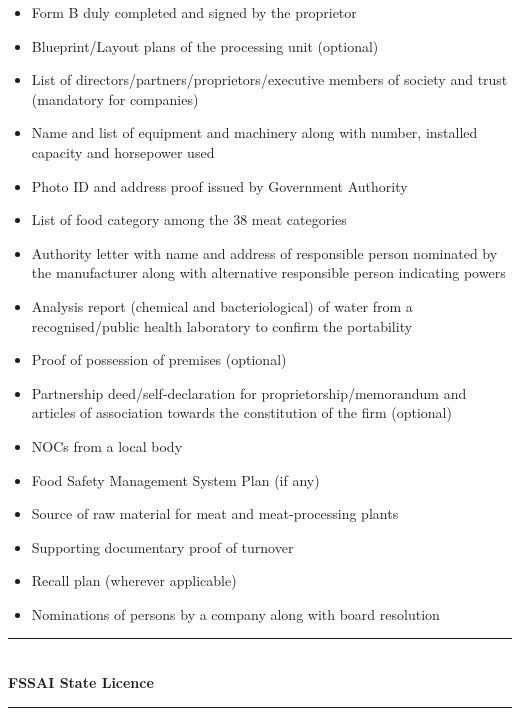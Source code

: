 \documentclass[a4paper, 12pt, twoside]{article}
\begin{document}
\begin{itemize}[noitemsep]
\item Form B duly completed and signed by the proprietor 
\item Blueprint/Layout plans of the processing unit (optional) 
\item List of directors/partners/proprietors/executive members of society and trust (mandatory for companies) 
\item Name and list of equipment and machinery along with number, installed capacity and horsepower used 
\item Photo ID and address proof issued by Government Authority 
\item List of food category among the 38 meat categories 
\item Authority letter with name and address of responsible person nominated by the manufacturer along with alternative responsible person indicating powers 
\item Analysis report (chemical and bacteriological) of water from a recognised/public health laboratory to confirm the portability 
\item Proof of possession of premises (optional) 
\item Partnership deed/self-declaration for proprietorship/memorandum and articles of association towards the constitution of the firm (optional) 
\item NOCs from a local body 
\item Food Safety Management System Plan (if any) 
\item Source of raw material for meat and meat-processing plants 
\item Supporting documentary proof of turnover 
\item Recall plan (wherever applicable) 
\item Nominations of persons by a company along with board resolution 
\end{itemize}
\noindent\rule{16cm}{0.4pt}\\
\textbf{FSSAI State Licence}\\
\noindent\rule{16cm}{0.4pt}
\end{document}
